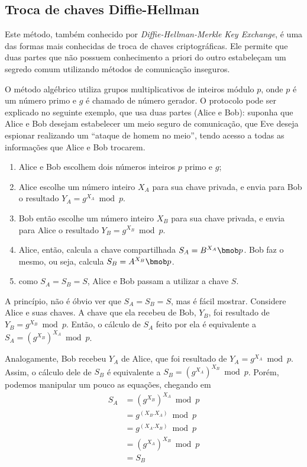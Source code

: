 
\subsection*{Troca de chaves Diffie-Hellman}

Este método, também conhecido por \emph{Diffie-Hellman-Merkle Key Exchange}, é uma das
formas mais conhecidas de troca de chaves criptográficas. Ele permite que duas partes
que não possuem conhecimento a priori do outro estabeleçam um segredo comum utilizando
métodos de comunicação inseguros.

O método algébrico utiliza grupos multiplicativos de inteiros módulo $p$, onde $p$ é um
número primo e $g$ é chamado de número gerador. O protocolo pode ser explicado no
seguinte exemplo, que usa duas partes (Alice e Bob): suponha que Alice e Bob desejam
estabelecer um meio seguro de comunicação, que Eve deseja espionar realizando um
``ataque de homem no meio'', tendo acesso a todas as informações que Alice e Bob
trocarem.

\begin{enumerate}
    \item Alice e Bob escolhem dois números inteiros $p$ primo e $g$;

    \item Alice escolhe um número inteiro $X_{A}$ para sua chave privada, e envia para
        Bob o resultado $Y_{A} = g^{X_{A}} \bmod p$.

    \item Bob então escolhe um número inteiro $X_{B}$ para sua chave privada, e envia
        para Alice o resultado $Y_{B} = g^{X_{B}} \bmod p$.

    \item Alice, então, calcula a chave compartilhada $S_A = B^{X_{A}} \bmob p$. Bob faz
        o mesmo, ou seja, calcula $S_B = A^{X_{B}} \bmob p$.

    \item como $S_A = S_B = S$, Alice e Bob passam a utilizar a chave $S$.
\end{enumerate}

A princípio, não é óbvio ver que $S_A = S_B = S$, mas é fácil mostrar. Considere Alice e
suas chaves. A chave que ela recebeu de Bob, $Y_{B}$, foi resultado de
$Y_{B} = g^{X_{B}} \bmod p$. Então, o cálculo de $S_A$ feito por ela é equivalente a
$S_A = (g^{X_{B}})^{X_{A}} \bmod p$.

Analogamente, Bob recebeu $Y_{A}$ de Alice, que foi resultado de
$Y_{A} = g^{X_{A}} \bmod p$. Assim, o cálculo dele de $S_B$ é equivalente a
$S_B = (g^{X_{A}})^{X_{B}} \bmod p$. Porém, podemos manipular um pouco as equações,
chegando em
\begin{align*}
S_A & = (g^{X_{B}})^{X_{A}} \bmod p \\
    & = g^{(X_{B}.X_{A})}   \bmod p \\
    & = g^{(X_{A}.X_{B})}   \bmod p \\
    & = (g^{X_{A}})^{X_{B}} \bmod p \\
    & = S_B
\end{align*}

